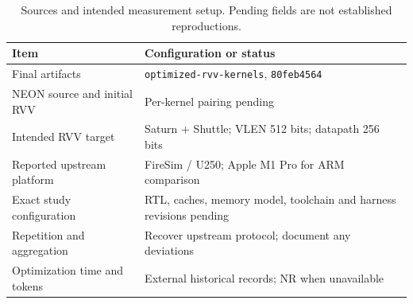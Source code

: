 \begin{table}[htbp]
\centering
\small
\caption{Sources and intended measurement setup. Pending fields are not established reproductions.}
\label{tab:setup}
\begin{tabular}{@{}p{.24\linewidth}p{.67\linewidth}@{}}
\toprule
Item & Configuration or status \\
\midrule
Final artifacts & \texttt{optimized-rvv-kernels}, \texttt{80feb4564} \\
NEON source and initial RVV & Per-kernel pairing pending \\
Intended RVV target & Saturn + Shuttle; VLEN 512 bits; datapath 256 bits \\
Reported upstream platform & FireSim / U250; Apple M1 Pro for ARM comparison \\
Exact study configuration & RTL, caches, memory model, toolchain and harness revisions pending \\
Repetition and aggregation & Recover upstream protocol; document any deviations \\
Optimization time and tokens & External historical records; NR when unavailable \\
\bottomrule
\end{tabular}
\end{table}
